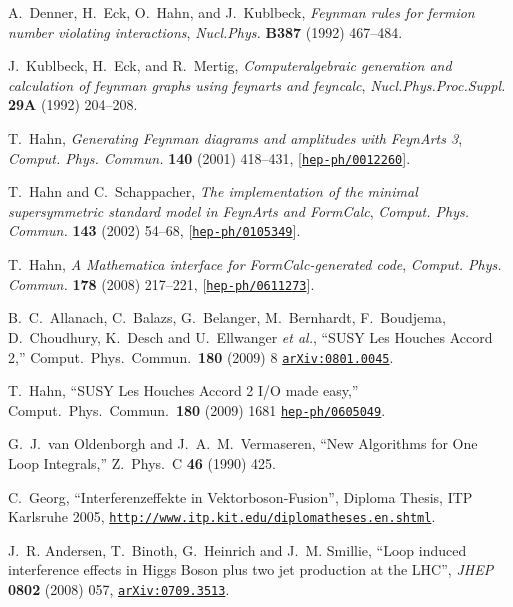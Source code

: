 \documentclass[english,12pt]{article}
\begin{document}
\begin{thebibliography}{10}
A.~Denner, H.~Eck, O.~Hahn, and J.~Kublbeck, {\it {Feynman rules for fermion
  number violating interactions}},  {\em Nucl.Phys.} {\bf B387} (1992)
  467--484.

J.~Kublbeck, H.~Eck, and R.~Mertig, {\it Computeralgebraic generation and
  calculation of feynman graphs using feynarts and feyncalc},  {\em
  Nucl.Phys.Proc.Suppl.} {\bf 29A} (1992) 204--208.

T.~Hahn, {\it {Generating Feynman diagrams and amplitudes with FeynArts 3}},
  {\em Comput. Phys. Commun.} {\bf 140} (2001) 418--431,
  [\href{http://www.arXiv.org/abs/hep-ph/0012260}{{\tt hep-ph/0012260}}].

T.~Hahn and C.~Schappacher, {\it {The implementation of the minimal
  supersymmetric standard model in FeynArts and FormCalc}},  {\em Comput. Phys.
  Commun.} {\bf 143} (2002) 54--68,
  [\href{http://www.arXiv.org/abs/hep-ph/0105349}{{\tt hep-ph/0105349}}].

T.~Hahn, {\it {A Mathematica interface for FormCalc-generated code}},  {\em
  Comput. Phys. Commun.} {\bf 178} (2008) 217--221,
  [\href{http://www.arXiv.org/abs/hep-ph/0611273}{{\tt hep-ph/0611273}}].

  B.~C.~Allanach, C.~Balazs, G.~Belanger, M.~Bernhardt, F.~Boudjema, D.~Choudhury, K.~Desch and U.~Ellwanger {\it et al.},
  ``SUSY Les Houches Accord 2,''
  Comput.\ Phys.\ Commun.\  {\bf 180} (2009) 8
  \href{http://arxiv.org/abs/0801.0045}{\tt arXiv:0801.0045}.

  T.~Hahn,
  ``SUSY Les Houches Accord 2 I/O made easy,''
  Comput.\ Phys.\ Commun.\  {\bf 180} (2009) 1681
  \href{http://arxiv.org/abs/hep-ph/0605049}{\tt hep-ph/0605049}.

  G.~J.~van Oldenborgh and J.~A.~M.~Vermaseren,
  ``New Algorithms for One Loop Integrals,''
  Z.\ Phys.\ C {\bf 46} (1990) 425.

C.~Georg, ``Interferenzeffekte in Vektorboson-Fusion'', {Diploma Thesis, ITP
  Karlsruhe 2005}, {\href{http://www.itp.kit.edu/diplomatheses.en.shtml}{\tt http://www.itp.kit.edu/diplomatheses.en.shtml}}.

J.~R. Andersen, T.~Binoth, G.~Heinrich and J.~M. Smillie, ``{Loop induced
  interference effects in Higgs Boson plus two jet production at the LHC}'',
  {\em JHEP} {\bf 0802} (2008) 057,
\href{http://www.arXiv.org/abs/0709.3513}{{\tt arXiv:0709.3513}}.


\end{thebibliography}
\end{document}
